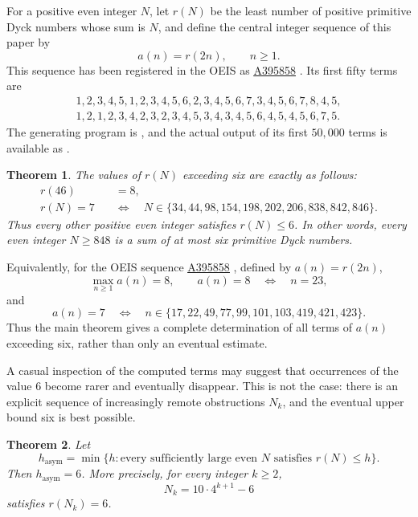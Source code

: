 \documentclass[12pt]{article}
\theoremstyle{plain}
\newtheorem{theorem}{Theorem}
\theoremstyle{definition}
\theoremstyle{plain}
\newcommand{\seqnum}[1]{\href{https://oeis.org/#1}{\rm \underline{#1}}}
\begin{document}
For a positive even integer $N$, let $r(N)$ be the least number of
positive primitive Dyck numbers whose sum is $N$, and define the central
integer sequence of this paper by
\[
        a(n)=r(2n),\qquad n\geq1.
\]
This sequence has been registered in the OEIS as
\seqnum{A395858} \cite{OEIS-A395858}.  Its first fifty terms are
\[
\begin{gathered}
1,2,3,4,5,1,2,3,4,5,6,2,3,4,5,6,7,3,4,5,6,7,8,4,5,\\
1,2,1,2,3,4,2,3,2,3,4,5,3,4,3,4,5,6,4,5,4,5,6,7,5.
\end{gathered}
\]
The generating program is
\href{https://github.com/growupkuriyama-hub/lean_cfg_project/blob/3525cfb/LeanCfgProject/PrimDyck/A395858.py}{},
and the actual output of its first $50{,}000$ terms is available as
\href{https://github.com/growupkuriyama-hub/lean_cfg_project/blob/3525cfb/LeanCfgProject/PrimDyck/b395858.txt}{}.

\begin{theorem}\label{thm:classification}
The values of $r(N)$ exceeding six are exactly as follows:
\[
\begin{aligned}
 r(46)&=8,\\[4pt]
 r(N)=7\quad&\Longleftrightarrow\quad
 N\in\{34,44,98,154,198,202,206,838,842,846\}.
\end{aligned}
\]
Thus every other positive even integer satisfies $r(N)\leq6$.  In other
words, every even integer $N\geq848$ is a sum of at most six primitive
Dyck numbers.
\end{theorem}

Equivalently, for the OEIS sequence \seqnum{A395858}
\cite{OEIS-A395858}, defined by $a(n)=r(2n)$,
\[
        \max_{n\geq1}a(n)=8,
        \qquad
        a(n)=8\quad\Longleftrightarrow\quad n=23,
\]
and
\[
 a(n)=7
 \quad\Longleftrightarrow\quad
 n\in\{17,22,49,77,99,101,103,419,421,423\}.
\]
Thus the main theorem gives a complete determination of all terms of
$a(n)$ exceeding six, rather than only an eventual estimate.


A casual inspection of the computed terms may suggest that occurrences of
the value $6$ become rarer and eventually disappear.  This is not the case:
there is an explicit sequence of increasingly remote obstructions $N_k$, and
the eventual upper bound six is best possible.

\begin{theorem}\label{thm:asymptotic-order}
Let
\[
 h_{\mathrm{asym}}
 =\min\{h:\text{every sufficiently large even }N\text{ satisfies }r(N)\leq h\}.
\]
Then $h_{\mathrm{asym}}=6$.  More precisely, for every integer $k\geq2$,
\[
 N_k=10\cdot4^{k+1}-6
\]
satisfies $r(N_k)=6$.
\end{theorem}
\end{document}
